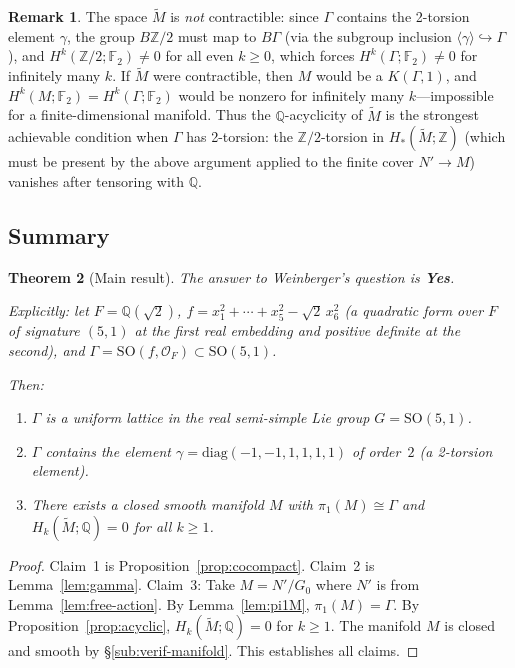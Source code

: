 \documentclass[12pt]{article}
\newtheorem{theorem}{Theorem}
\theoremstyle{definition}
\newtheorem{remark}[theorem]{Remark}
\theoremstyle{remark}
\begin{document}
\begin{remark}
\label{rem:only-rational}
The space $\widetilde{M}$ is \emph{not} contractible: since $\Gamma$ contains the
2-torsion element $\gamma$, the group $B\mathbb{Z}/2$ must map to $B\Gamma$ (via the
subgroup inclusion $\langle\gamma\rangle \hookrightarrow \Gamma$), and
$H^k(\mathbb{Z}/2;\mathbb{F}_2) \neq 0$ for all even $k \geq 0$, which forces
$H^k(\Gamma;\mathbb{F}_2) \neq 0$ for infinitely many $k$. If $\widetilde{M}$ were
contractible, then $M$ would be a $K(\Gamma,1)$, and $H^k(M;\mathbb{F}_2) = H^k(\Gamma;\mathbb{F}_2)$
would be nonzero for infinitely many $k$---impossible for a finite-dimensional manifold.
Thus the $\mathbb{Q}$-acyclicity of $\widetilde{M}$ is the strongest achievable condition
when $\Gamma$ has 2-torsion: the $\mathbb{Z}/2$-torsion in $H_*(\widetilde{M};\mathbb{Z})$
(which must be present by the above argument applied to the finite cover $N' \to M$)
vanishes after tensoring with $\mathbb{Q}$.
\end{remark}

\subsection{Summary}

\begin{theorem}[Main result]
\label{thm:main}
The answer to Weinberger's question is \textbf{Yes}.

Explicitly: let $F = \mathbb{Q}(\sqrt{2})$, $f = x_1^2+\cdots+x_5^2-\sqrt{2}\,x_6^2$
(a quadratic form over $F$ of signature $(5,1)$ at the first real embedding and
positive definite at the second), and
$\Gamma = \mathrm{SO}(f,\mathcal{O}_F) \subset \mathrm{SO}(5,1)$.

Then:
\begin{enumerate}
  \item $\Gamma$ is a uniform lattice in the real semi-simple Lie group
        $G = \mathrm{SO}(5,1)$.
  \item $\Gamma$ contains the element $\gamma = \mathrm{diag}(-1,-1,1,1,1,1)$
        of order~$2$ (a 2-torsion element).
  \item There exists a closed smooth manifold $M$ with $\pi_1(M) \cong \Gamma$ and
        $H_k(\widetilde{M};\mathbb{Q}) = 0$ for all $k \geq 1$.
\end{enumerate}
\end{theorem}

\begin{proof}
Claim~1 is Proposition~\ref{prop:cocompact}. Claim~2 is Lemma~\ref{lem:gamma}.
Claim~3: Take $M = N'/G_0$ where $N'$ is from Lemma~\ref{lem:free-action}. By
Lemma~\ref{lem:pi1M}, $\pi_1(M) = \Gamma$. By Proposition~\ref{prop:acyclic},
$H_k(\widetilde{M};\mathbb{Q}) = 0$ for $k\geq 1$. The manifold $M$ is closed and smooth
by \S\ref{sub:verif-manifold}. This establishes all claims.
\end{proof}
\end{document}
